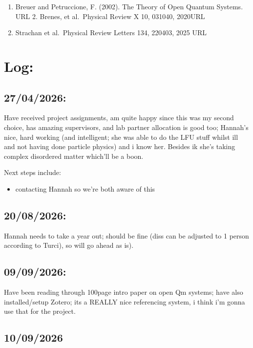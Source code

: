 \documentclass[
  letterpaper,
  DIV=11,
  numbers=noendperiod]{scrartcl}
\providecommand{\tightlist}{%
  \setlength{\itemsep}{0pt}\setlength{\parskip}{0pt}}
\begin{document}
\begin{enumerate}
\def\labelenumi{\arabic{enumi}.}
\tightlist
\item
  Breuer and Petruccione, F. (2002). The Theory of Open Quantum Systems.
  URL 2. Brenes, et al.~Physical Review X 10, 031040, 2020URL
\item
  Strachan et al.~Physical Review Letters 134, 220403, 2025 URL
\end{enumerate}

\section{Log:}\label{log}

\subsection{27/04/2026:}\label{section}

Have received project assignments, am quite happy since this was my
second choice, has amazing supervisors, and lab partner allocation is
good too; Hannah's nice, hard working (and intelligent; she was able to
do the LFU stuff whilst ill and not having done particle physics) and i
know her. Besides ik she's taking complex disordered matter which'll be
a boon.

Next steps include:

\begin{itemize}
\tightlist
\item
  contacting Hannah so we're both aware of this
\end{itemize}

\subsection{20/08/2026:}\label{section-1}

Hannah needs to take a year out; should be fine (diss can be adjusted to
1 person according to Turci), so will go ahead as is).

\subsection{09/09/2026:}\label{section-2}

Have been reading through 100page intro paper on open Qm systems; have
also installed/setup Zotero; its a REALLY nice referencing system, i
think i'm gonna use that for the project.

\subsection{10/09/2026}\label{section-3}
\end{document}

